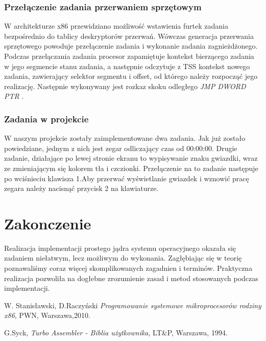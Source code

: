 \documentclass[a4paper,12pt]{article}
\begin{document}
			\subsubsection{Przełączenie zadania przerwaniem sprzętowym}
			 W architekturze x86 przewidziano możliwość wstawienia furtek zadania bezpośrednio do tablicy deskryptorów przerwań. Wówczas generacja przerwania sprzętowego powoduje przełączenie zadania i wykonanie zadania zagnieżdżonego. Podczas przełączania zadania procesor zapamiętuje kontekst bierzącego zadania w jego segmencie stanu zadania, a następnie odczytuje z TSS kontekst nowego zadania, zawierający selektor segmentu i offset, od którego należy rozpocząć jego realizację.  Następnie wykonywany jest rozkaz skoku odległego \textit{JMP DWORD PTR }.
 	
	\subsubsection{Zadania w projekcie}
		W naszym projekcie zostały zaimplementowane dwa zadania. Jak już zostało powiedziane, jednym z nich jest  zegar odliczający czas od 00:00:00. Drugie zadanie, działające po lewej stronie ekranu to wypisywanie znaku gwiazdki, wraz ze zmieniającym się kolorem tła i czczionki. Przełączenie na to zadanie następuje po wciśnieciu klawisza 1.Aby przerwać wyświetlanie gwiazdek i wznowić pracę zegara należy nacisnąć przycisk 2 na klawiaturze.
	
	
	\section{Zakonczenie}
		Realizacja implementacji prostego jądra systemu operacyjnego okazała się zadaniem niełatwym, lecz możliwym do wykonania. Zagłębiając się w teorię poznawaliśmy coraz więcej skomplikowanych zagadnien i  terminów.  Praktyczna realizacja pozwoliła na dogłebne zrozumienie zasad i metod stosowanych podczas implementacji. 
	

\begin{thebibliography}{999}
 W. Stanisławski, D.Raczyński 
{\em Programowanie systemowe mikroprocesorów rodziny x86},
PWN, Warszawa,2010.

 G.Syck,
{\em Turbo Assembler - Biblia użytkownika}, 
LT\&P, Warszawa, 1994.



\end{thebibliography}	
\end{document}
